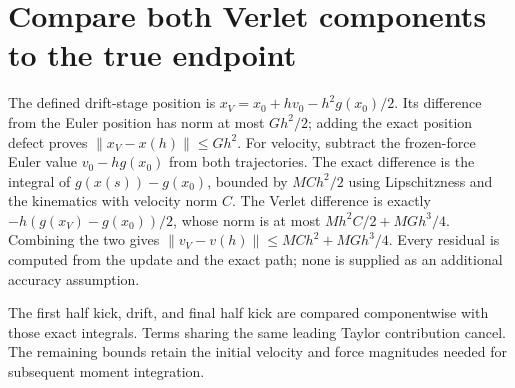 \documentclass[11pt,a4paper]{article}
\begin{document}
\section{\texorpdfstring{Compare both Verlet components to the true endpoint}{Compare both Verlet components to the true endpoint}}


The defined drift-stage position is \(x_V=x_0+hv_0-h^2g(x_0)/2\). Its difference from the Euler position has norm at most \(Gh^2/2\); adding the exact position defect proves \(\|x_V-x(h)\|\le Gh^2\). For velocity, subtract the frozen-force Euler value \(v_0-hg(x_0)\) from both trajectories. The exact difference is the integral of \(g(x(s))-g(x_0)\), bounded by \(MC h^2/2\) using Lipschitzness and the kinematics with velocity norm \(C\). The Verlet difference is exactly \(-h(g(x_V)-g(x_0))/2\), whose norm is at most \(Mh^2C/2+MGh^3/4\). Combining the two gives \(\|v_V-v(h)\|\le MC h^2+MGh^3/4\). Every residual is computed from the update and the exact path; none is supplied as an additional accuracy assumption.



The first half kick, drift, and final half kick are compared componentwise with those exact integrals. Terms sharing the same leading Taylor contribution cancel. The remaining bounds retain the initial velocity and force magnitudes needed for subsequent moment integration.
\end{document}
